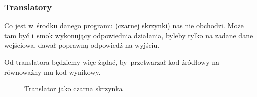 \documentclass[10pt,t]{beamer}
\begin{document}
\begin{frame}
  \frametitle{Translatory}


  Co jest w~środku danego programu (czarnej skrzynki) nas nie obchodzi.
  Może tam być i~smok wykonujący odpowiednia działania, byleby tylko
  na zadane dane wejściowa, dawał poprawną odpowiedź na wyjściu.

  Od translatora będziemy więc żądać, by~przetwarzał kod źródłowy
  na równoważny mu kod wynikowy.





  \begin{figure}

    \label{fig:Translator-04}


    \caption{Translator jako czarna skrzynka}


  \end{figure}

\end{frame}
\end{document}
